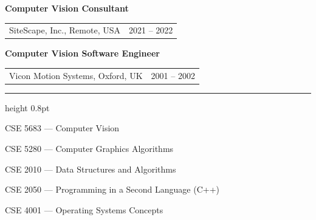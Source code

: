 \documentclass[11pt]{article}
\makeatletter
\newcommand{\cvsection}[1]{%
  \vspace{12pt}%
  {\normalfont\large\scshape\textls[120]{#1}}\par
  \vspace{2pt}\hrule height 0.8pt\vspace{7pt}}
\newcommand{\cvsubsection}[1]{%
  \vspace{6pt}{\normalfont\scshape #1}\par\vspace{3pt}}
\newcommand{\role}[3]{%
  \par\vspace{4pt}\noindent\textbf{#1}\\[1pt]%
  \begin{tabularx}{\linewidth}{@{}Xr@{}}#2 & #3\end{tabularx}\par}
\makeatother
\begin{document}
\vspace{6pt}
\cvsubsection{Industry}
\role{Computer Vision Consultant}{SiteScape, Inc., Remote, USA}{2021 -- 2022}
\role{Computer Vision Software Engineer}{Vicon Motion Systems, Oxford, UK}{2001 -- 2002}

\cvsection{Teaching}
\cvsubsection{Graduate Courses}
\begin{cvitems}
  \item CSE 5683 --- Computer Vision
  \item CSE 5280 --- Computer Graphics Algorithms
\end{cvitems}
\vspace{4pt}
\cvsubsection{Undergraduate Courses}
\begin{cvitems}
  \item CSE 2010 --- Data Structures and Algorithms
  \item CSE 2050 --- Programming in a Second Language (C++)
  \item CSE 4001 --- Operating Systems Concepts
\end{cvitems}
\end{document}
